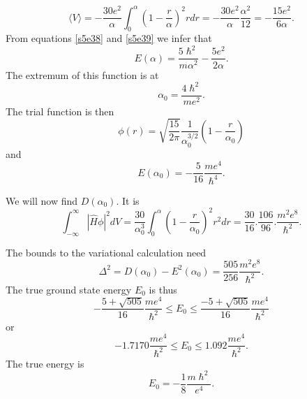 \documentclass{article}
\numberwithin{equation}{section}
\begin{document}
\begin{equation}\label{s5e39}
\langle V \rangle = -\frac{30e^2}{\alpha}\int_0^\alpha
\left(1-\frac{r}{\alpha}\right)^2 rdr = -\frac{30 e^2}{\alpha}
\frac{\alpha^2}{12} = -\frac{15 e^2}{6\alpha}.
\end{equation}
From equations \eqref{s5e38} and \eqref{s5e39} we infer that
\begin{equation}\label{s5e40}
E(\alpha) = \frac{5\hslash^2}{m\alpha^2} - \frac{5e^2}{2\alpha}.
\end{equation}
The extremum of this function is at
\begin{equation}\label{s5e41}
\alpha_0 = \frac{4\hslash^2}{me^2}.
\end{equation}
The trial function is then
\begin{equation}\label{s5e42}
\phi(r) = \sqrt{\frac{15}{2\pi}}\frac{1}{\alpha_0^{3/2}}\left(1 - 
\frac{r}{\alpha_0}\right)
\end{equation}
and
\begin{equation}\label{s5e43}
E(\alpha_0) = -\frac{5}{16}\frac{me^4}{\hslash^4}.
\end{equation}

We will now find $D(\alpha_0)$. It is
\begin{equation}\label{s5e44}
\int_{-\infty}^\infty |\hat{H}\phi|^2dV = 
\frac{30}{\alpha_0^3}\int_0^\alpha\left(1 - \frac{r}{\alpha_0}\right)^2
r^2dr = \frac{30}{16}.\frac{106}{96}.\frac{m^2e^8}{\hslash^2}.
\end{equation}

The bounds to the variational calculation need
\[
\Delta^2 = D(\alpha_0) - E^2(\alpha_0) = \frac{505}{256}\frac{m^2e^8}
{\hslash^2}.
\]
The true ground state energy $E_0$ is thus
\begin{equation}\label{s5e45}
-\frac{5 + \sqrt{505}}{16}\frac{me^4}{\hslash^2} \le E_0 \le
\frac{-5 + \sqrt{505}}{16}\frac{me^4}{\hslash^2} 
\end{equation}
or
\begin{equation}\label{s5e46}
-1.7170\frac{me^4}{\hslash^2} \le E_0 \le 1.092\frac{me^4}{\hslash^2}.
\end{equation}
The true energy is
\begin{equation}\label{s5e47}
E_0 = -\frac{1}{8}\frac{m\hslash^2}{e^4}.
\end{equation}
\end{document}
